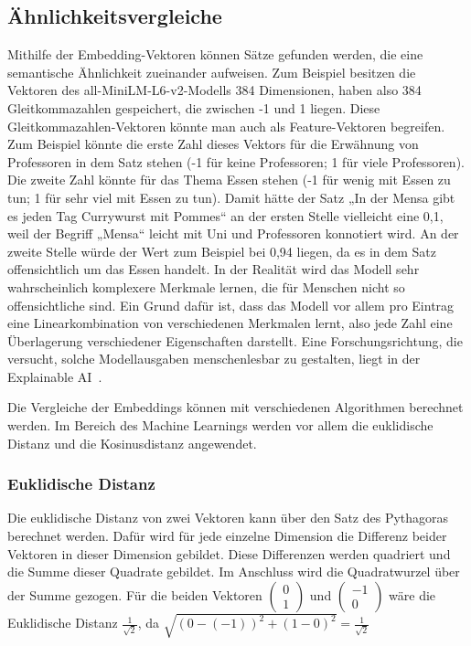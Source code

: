 \subsection{Ähnlichkeitsvergleiche}

Mithilfe der Embedding-Vektoren können Sätze gefunden werden, die eine semantische Ähnlichkeit zueinander aufweisen.
Zum Beispiel besitzen die Vektoren des all-MiniLM-L6-v2-Modells 384 Dimensionen, haben also 384 Gleitkommazahlen gespeichert, die zwischen -1 und 1 liegen.
Diese Gleitkommazahlen-Vektoren könnte man auch als Feature-Vektoren begreifen.
Zum Beispiel könnte die erste Zahl dieses Vektors für die Erwähnung von Professoren in dem Satz stehen (-1 für keine Professoren; 1 für viele Professoren).
Die zweite Zahl könnte für das Thema Essen stehen (-1 für wenig mit Essen zu tun; 1 für sehr viel mit Essen zu tun).
Damit hätte der Satz „In der Mensa gibt es jeden Tag Currywurst mit Pommes“ an der ersten Stelle vielleicht eine 0,1, weil der Begriff „Mensa“ leicht mit Uni und Professoren konnotiert wird.
An der zweite Stelle würde der Wert zum Beispiel bei 0,94 liegen, da es in dem Satz offensichtlich um das Essen handelt.
In der Realität wird das Modell sehr wahrscheinlich komplexere Merkmale lernen, die für Menschen nicht so offensichtliche sind.
Ein Grund dafür ist, dass das Modell vor allem pro Eintrag eine Linearkombination von verschiedenen Merkmalen lernt, also jede Zahl eine Überlagerung verschiedener Eigenschaften darstellt.
Eine Forschungsrichtung, die versucht, solche Modellausgaben menschenlesbar zu gestalten, liegt in der Explainable AI~\cite{hassija2024}.

Die Vergleiche der Embeddings können mit verschiedenen Algorithmen berechnet werden.
Im Bereich des Machine Learnings werden vor allem die euklidische Distanz und die Kosinusdistanz angewendet.

\subsubsection{Euklidische Distanz}

Die euklidische Distanz von zwei Vektoren kann über den Satz des Pythagoras berechnet werden.
Dafür wird für jede einzelne Dimension die Differenz beider Vektoren in dieser Dimension gebildet.
Diese Differenzen werden quadriert und die Summe dieser Quadrate gebildet.
Im Anschluss wird die Quadratwurzel über der Summe gezogen.
Für die beiden Vektoren
$\begin{pmatrix}0\\1\end{pmatrix}$
und
$\begin{pmatrix}-1\\0\end{pmatrix}$
wäre die Euklidische Distanz
$\frac{1}{\sqrt{2}}$, \vspace{5mm} \newline da $\sqrt{(0-(-1))^2 + (1-0)^2}=\frac{1}{\sqrt{2}}$

